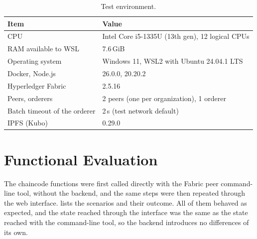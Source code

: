 \begin{table}[htbp]
    \centering
    \small
    \begin{tabular}{ll}
        \toprule
        Item & Value \\
        \midrule
        CPU & Intel Core i5-1335U (13th gen), 12 logical CPUs \\
        RAM available to WSL & 7.6\,GiB \\
        Operating system & Windows 11, WSL2 with Ubuntu 24.04.1 LTS \\
        Docker, Node.js & 26.0.0, 20.20.2 \\
        Hyperledger Fabric & 2.5.16 \\
        Peers, orderers & 2 peers (one per organization), 1 orderer \\
        Batch timeout of the orderer & 2\,s (test network default) \\
        IPFS (Kubo) & 0.29.0 \\
        \bottomrule
    \end{tabular}
    \caption{Test environment.}
    \label{tab:environment}
\end{table}

\section{Functional Evaluation}
\label{sec:results-functional}

The chaincode functions were first called directly with the Fabric peer command-line tool, without the backend, and the same steps were then repeated through the web interface.  lists the scenarios and their outcome. All of them behaved as expected, and the state reached through the interface was the same as the state reached with the command-line tool, so the backend introduces no differences of its own.

